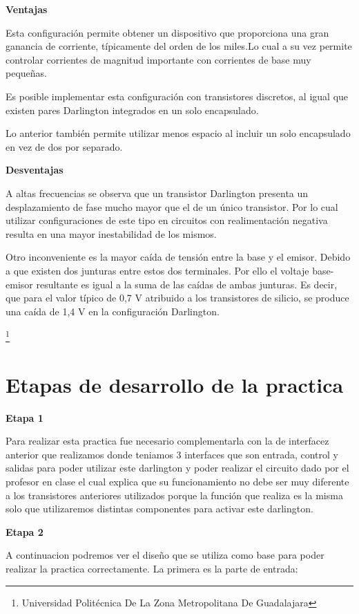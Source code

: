 \documentclass[11pt,a4paper]{article}
\begin{document}
\textbf{Ventajas}

Esta configuración permite obtener un dispositivo que proporciona una gran ganancia de corriente, típicamente del orden de los miles.Lo cual a su vez permite controlar corrientes de magnitud importante con corrientes de base muy pequeñas.

Es posible implementar esta configuración con transistores discretos, al igual que existen pares Darlington integrados en un solo encapsulado.

Lo anterior también permite utilizar menos espacio al incluir un solo encapsulado en vez de dos por separado. 

\textbf{Desventajas}

A altas frecuencias se observa que un transistor Darlington presenta un desplazamiento de fase mucho mayor que el de un único transistor. Por lo cual utilizar configuraciones de este tipo en circuitos con realimentación negativa resulta en una mayor inestabilidad de los mismos.

Otro inconveniente es la mayor caída de tensión entre la base y el emisor. Debido a que existen dos junturas entre estos dos terminales. Por ello el voltaje base-emisor resultante es igual a la suma de las caídas de ambas junturas. Es decir, que para el valor típico de 0,7 V atribuido a los transistores de silicio, se produce una caída de 1,4 V en la configuración Darlington. 

\footnote{Universidad Politécnica De La Zona Metropolitana De Guadalajara} 

\newpage

\section{Etapas de desarrollo de la practica}

\textbf{Etapa 1}

Para realizar esta practica fue necesario complementarla con la de interfacez anterior que realizamos donde teniamos 3 interfaces que son entrada, control y salidas para poder utilizar este darlington y poder realizar el circuito dado por el profesor en clase el cual explica que su funcionamiento no debe ser muy diferente a los transistores anteriores utilizados porque la función que realiza es la misma solo que utilizaremos distintas componentes para activar este darlington.

\textbf{Etapa 2}

A continuacion podremos ver el diseño que se utiliza como base para poder realizar la practica correctamente. La primera es la parte de entrada:
\end{document}
